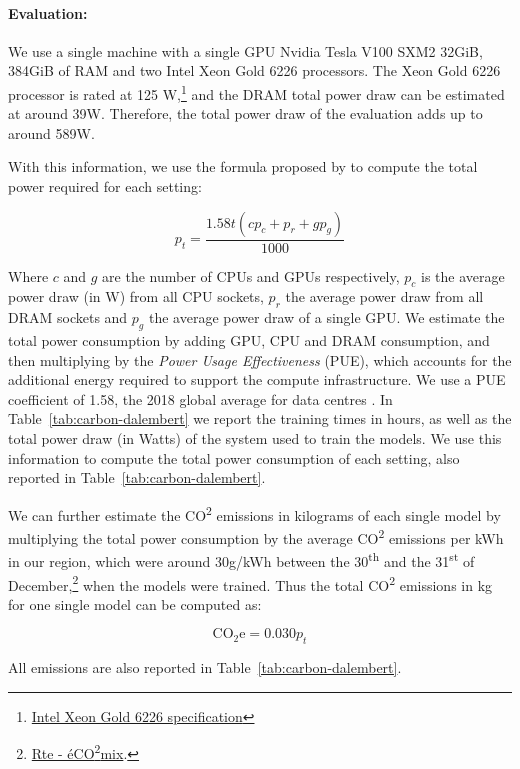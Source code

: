 \paragraph{Evaluation:} We use a single machine with a single GPU Nvidia Tesla V100 SXM2 32GiB, 384GiB of RAM and two Intel Xeon Gold 6226 processors. The Xeon Gold 6226 processor is rated at 125 W,\footnote{\href{https://ark.intel.com/content/www/us/en/ark/products/193957/intel-xeon-gold-6226-processor-19-25m-cache-2-70-ghz.html}{Intel Xeon Gold 6226 specification}} and the DRAM total power draw can be estimated at around 39W. Therefore, the total power draw of the evaluation adds up to around 589W.

With this information, we use the formula proposed by  to compute the total power required for each setting:

\begin{equation*}
    p_t = \frac{1.58t(cp_{c} + p_r + gp_g)}{1000}
\end{equation*}

Where $c$ and $g$ are the number of CPUs and GPUs respectively, $p_c$ is the average power draw (in W) from all CPU sockets, $p_r$ the average power draw from all DRAM sockets and $p_g$ the average power draw of a single GPU. We estimate the total power consumption by adding GPU, CPU and DRAM consumption, and then multiplying by the \emph{Power Usage Effectiveness} (PUE), which accounts for the additional energy required to support the compute infrastructure. We use a PUE coefficient of 1.58, the 2018 global average for data centres \cite{strubell-etal-2019-energy}. In Table~\ref{tab:carbon-dalembert} we report the training times in hours, as well as the total power draw (in Watts) of the system used to train the models. We use this information to compute the total power consumption of each setting, also reported in Table~\ref{tab:carbon-dalembert}.

We can further estimate the CO\textsuperscript{2} emissions in kilograms of each single model by multiplying the total power consumption by the average CO\textsuperscript{2} emissions per kWh in our region, which were around 30g/kWh between the 30\textsuperscript{th} and the 31\textsuperscript{st} of December,\footnote{\href{https://www.rte-france.com/eco2mix/les-emissions-de-co2-par-kwh-produit-en-france}{Rte - éCO\textsuperscript{2}mix}.} when the models were trained. Thus the total CO\textsuperscript{2} emissions in kg for one single model can be computed as:

\begin{equation*}
    \text{CO}_{2}\text{e} = 0.030 p_t
\end{equation*}

All emissions are also reported in Table~\ref{tab:carbon-dalembert}.